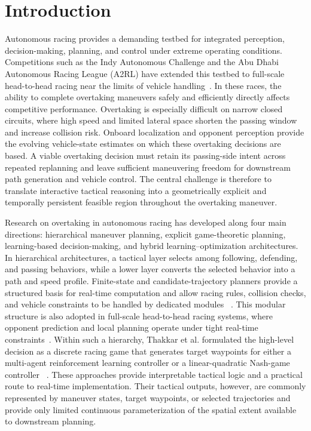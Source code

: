 \documentclass[sensors,article,submit,moreauthors]{Definitions/mdpi}
\begin{document}
\raggedbottom

\section{Introduction}
Autonomous racing provides a demanding testbed for integrated perception, decision-making, planning, and control under extreme operating conditions. Competitions such as the Indy Autonomous Challenge and the Abu Dhabi Autonomous Racing League (A2RL) have extended this testbed to full-scale head-to-head racing near the limits of vehicle handling~\cite{betz2022survey,hoffmann2026a2rl}. In these races, the ability to complete overtaking maneuvers safely and efficiently directly affects competitive performance. Overtaking is especially difficult on narrow closed circuits, where high speed and limited lateral space shorten the passing window and increase collision risk. Onboard localization and opponent perception provide the evolving vehicle-state estimates on which these overtaking decisions are based. A viable overtaking decision must retain its passing-side intent across repeated replanning and leave sufficient maneuvering freedom for downstream path generation and vehicle control. The central challenge is therefore to translate interactive tactical reasoning into a geometrically explicit and temporally persistent feasible region throughout the overtaking maneuver.



Research on overtaking in autonomous racing has developed along four main
directions: hierarchical maneuver planning, explicit game-theoretic planning,
learning-based decision-making, and hybrid learning--optimization
architectures.
In hierarchical architectures, a tactical layer selects among following,
defending, and passing behaviors, while a lower layer converts the selected
behavior into a path and speed profile.
Finite-state and candidate-trajectory planners provide a structured basis for
real-time computation and allow racing rules, collision checks, and vehicle
constraints to be handled by dedicated modules
~\cite{sureshbabu2022autopass,kim2023hierarchical}.
This modular structure is also adopted in full-scale head-to-head racing
systems, where opponent prediction and local planning operate under tight
real-time constraints~\cite{jung2023iac,hoffmann2026a2rl}.
Within such a hierarchy, Thakkar et al. formulated the high-level decision as
a discrete racing game that generates target waypoints for either a multi-agent
reinforcement learning controller or a linear-quadratic Nash-game controller
~\cite{thakkar2024hierarchical}.
These approaches provide interpretable tactical logic and a practical route to
real-time implementation. Their tactical outputs, however, are commonly
represented by maneuver states, target waypoints, or selected trajectories and
provide only limited continuous parameterization of the spatial extent
available to downstream planning.
\end{document}
